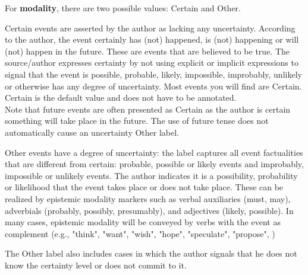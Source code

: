 \noindent
For \textbf{modality}, there are two possible values: Certain and Other.

\begin{description}[noitemsep,leftmargin=!,labelwidth=\widthof{\bfseries Certain}]
    \item[Certain] Certain events are asserted by the author as lacking any uncertainty.
    According to the author, the event certainly has (not) happened, is (not) happening or will (not) happen in the future.
    These are events that are believed to be true.
    The source/author expresses certainty by not using explicit or implicit expressions to signal that the event is possible, probable, likely, impossible, improbably, unlikely or otherwise has any degree of uncertainty.
    Most events you will find are Certain.
    Certain is the default value and does not have to be annotated.\\
    Note that future events are often presented as Certain as the author is certain something will take place in the future.
    The use of future tense does not automatically cause an uncertainty Other label.
    
    \item[Other] Other events have a degree of uncertainty: the label captures all event factualities that are different from certain: probable, possible or likely events and improbably, impossible or unlikely events.
    The author indicates it is a possibility, probability or likelihood that the event takes place or does not take place.
    These can be realized by epistemic modality markers such as verbal auxiliaries (must, may), adverbials (probably, possibly, presumably), and adjectives (likely, possible).
    In many cases, epistemic modality will be conveyed by verbs with the event as complement (e.g., "think", "want", "wish", "hope", "speculate", "propose", )
    
    The Other label also includes cases in which the author signals that he does not know the certainty level or does not commit to it.

\end{description}


